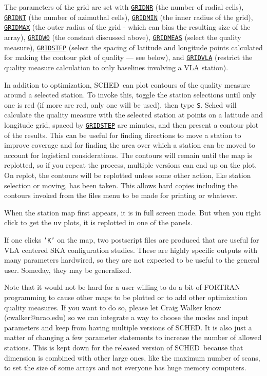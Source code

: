 \documentclass{report}
\newcommand{\sched}{{\sc SCHED}}
\newcommand{\schedb}{{\sc SCHED~}}
\begin{document}
The parameters of the grid are set with 
{\hyperref[MP:GRIDNR]{{\tt GRIDNR}}} (the number of radial cells), 
{\hyperref[MP:GRIDNT]{{\tt GRIDNT}}} (the number of azimuthal cells), 
{\hyperref[MP:GRIDMIN]{{\tt GRIDMIN}}} (the inner radius of the grid), 
{\hyperref[MP:GRIDMAX]{{\tt GRIDMAX}}}
(the outer radius of the grid - which can bias
the resulting size of the array), 
{\hyperref[MP:GRIDW0]{{\tt GRIDW0}}}
(the constant discussed above), 
{\hyperref[MP:GRIDMEAS]{{\tt GRIDMEAS}}}
(select the quality measure), 
{\hyperref[MP:GRIDSTEP]{{\tt GRIDSTEP}}}
(select the spacing of latitude and longitude points calculated for
making the contour plot of quality --- see below), and 
{\hyperref[MP:GRIDVLA]{{\tt GRIDVLA}}}
(restrict the quality measure calculation to
only baselines involving a VLA station).

In addition to optimization, \schedb can plot contours of the quality
measure around a selected station.  To invoke this, toggle the station
selections until only one is red (if more are red, only one will be
used), then type {\tt S}.  Sched will calculate the quality measure
with the selected station at points on a latitude and longitude grid,
spaced by 
{\hyperref[MP:GRIDSTEP]{{\tt GRIDSTEP}}} arc minutes, and then
present a contour plot of the results.  This can be useful for finding
directions to move a station to improve coverage and for finding
the area over which a station can be moved to account for logistical
considerations.  The contours will remain until the map is replotted,
so if you repeat the process, multiple versions can end up on the
plot.  On replot, the contours will be replotted unless some other
action, like station selection or moving, has been taken.  This allows
hard copies including the contours invoked from the files menu to be made
for printing or whatever.

When the station map first appears, it is in full screen
mode.  But when you right click to get the uv plots, it is replotted
in one of the panels.

If one clicks {\tt 'K'} on the map, two postscript files are produced
that are useful for VLA centered SKA configuration studies.  These
are highly specific outputs with many parameters hardwired, so they
are not expected to be useful to the general user.  Someday, they
may be generalized.

Note that it would not be hard for a user willing to do a bit of
FORTRAN programming to cause other maps to be plotted or to add other
optimization quality measures.  If you want to do so, please let Craig
Walker know (cwalker@nrao.edu) so we can integrate a way to choose the
modes and input parameters and keep from having multiple versions of
\sched.  It is also just a matter of changing a few parameter statements
to increase the number of allowed stations.  This is kept down for
the released version of \schedb because that dimension is combined
with other large ones, like the maximum number of scans, to set the
size of some arrays and not everyone has huge memory computers.
\end{document}

